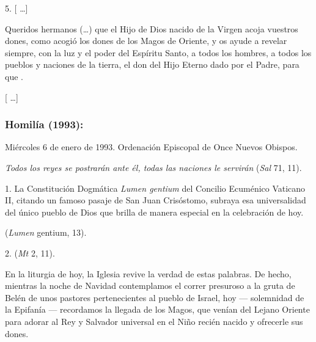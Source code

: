\begin{body}
	5. {[} \ldots{}{]}

	Queridos hermanos (\ldots{}) que el Hijo de Dios nacido de la Virgen acoja vuestros dones, como acogió los dones de los Magos de Oriente, y os ayude a revelar siempre, con la luz y el poder del Espíritu Santo, a todos los hombres, a todos los pueblos y naciones de la tierra, el don del Hijo Eterno dado por el Padre, para que .

	{[} \ldots{}{]}

	\subsubsection{Homilía (1993):} Miércoles 6 de enero de 1993. Ordenación Episcopal de Once Nuevos Obispos.

	\emph{Todos los reyes se postrarán ante él, todas las naciones le servirán} (\emph{Sal} 71, 11).

	1. La Constitución Dogmática \emph{Lumen gentium} del Concilio Ecuménico Vaticano II, citando un famoso pasaje de San Juan Crisóstomo, subraya esa universalidad del único pueblo de Dios que brilla de manera especial en la celebración de hoy.

	 (\emph{Lumen} gentium, 13).

	2.  (\emph{Mt} 2, 11).

	En la liturgia de hoy, la Iglesia revive la verdad de estas palabras. De hecho, mientras la noche de Navidad contemplamos el correr presuroso a la gruta de Belén de unos pastores pertenecientes al pueblo de Israel, hoy --- solemnidad de la Epifanía --- recordamos la llegada de los Magos, que venían del Lejano Oriente para adorar al Rey y Salvador universal en el Niño recién nacido y ofrecerle sus dones.


\end{body}
